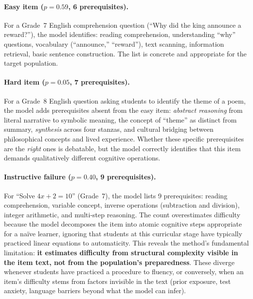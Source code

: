 \paragraph{Easy item ($p = 0.59$, 6 prerequisites).} For a Grade~7 English comprehension question (``Why did the king announce a reward?''), the model identifies: reading comprehension, understanding ``why'' questions, vocabulary (``announce,'' ``reward''), text scanning, information retrieval, basic sentence construction. The list is concrete and appropriate for the target population.

\paragraph{Hard item ($p = 0.05$, 7 prerequisites).} For a Grade~8 English question asking students to identify the theme of a poem, the model adds prerequisites absent from the easy item: \emph{abstract reasoning} from literal narrative to symbolic meaning, the concept of ``theme'' as distinct from summary, \emph{synthesis} across four stanzas, and cultural bridging between philosophical concepts and lived experience. Whether these specific prerequisites are the \emph{right} ones is debatable, but the model correctly identifies that this item demands qualitatively different cognitive operations.

\paragraph{Instructive failure ($p = 0.40$, 9 prerequisites).} For ``Solve $4x + 2 = 10$'' (Grade~7), the model lists 9 prerequisites: reading comprehension, variable concept, inverse operations (subtraction and division), integer arithmetic, and multi-step reasoning. The count overestimates difficulty because the model decomposes the item into atomic cognitive steps appropriate for a na\"{i}ve learner, ignoring that students at this curricular stage have typically practiced linear equations to automaticity. This reveals the method's fundamental limitation: \textbf{it estimates difficulty from structural complexity visible in the item text, not from the population's preparedness}. These diverge whenever students have practiced a procedure to fluency, or conversely, when an item's difficulty stems from factors invisible in the text (prior exposure, test anxiety, language barriers beyond what the model can infer).

